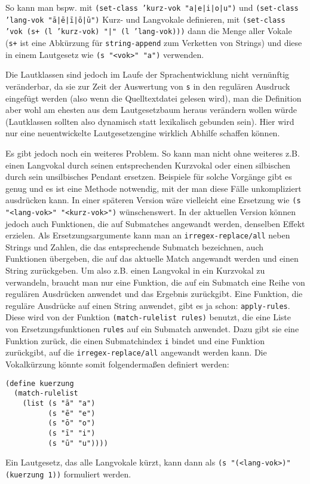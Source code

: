 \documentclass[12pt,a4paper,normalheadings,bibliography=totoc]{scrartcl}
\def\tt#1{\texttt{#1}}
\begin{document}
So kann man bspw. mit \tt{(set-class 'kurz-vok "a|e|i|o|u")} und
\tt{(set-class 'lang-vok "ā|ē|ī|ō|ū")} Kurz- und Langvokale definieren,
mit \tt{(set-class 'vok (s+ (l 'kurz-vok) "|" (l 'lang-vok)))} dann die Menge
aller Vokale
(\tt{s+} ist eine Abkürzung für \tt{string-append} zum Verketten von Strings)
und diese in einem Lautgesetz wie \tt{(s "<vok>" "a")} verwenden.

Die Lautklassen sind jedoch im Laufe der Sprachentwicklung
nicht vernünftig veränderbar,
da sie zur Zeit der Auswertung von \tt{s} in den regulären Ausdruck
eingefügt werden (also wenn die Quelltextdatei gelesen wird),
man die Definition aber wohl am ehesten aus dem Lautgesetzbaum heraus
verändern wollen würde
(Lautklassen sollten also dynamisch statt lexikalisch gebunden sein).
Hier wird nur eine neuentwickelte Lautgesetzengine wirklich
Abhilfe schaffen können.

Es gibt jedoch noch ein weiteres Problem.
So kann man nicht ohne weiteres z.B. einen Langvokal durch seinen
entsprechenden Kurzvokal oder einen silbischen durch sein unsilbisches
Pendant ersetzen.
Beispiele für solche Vorgänge gibt es genug und es ist eine Methode notwendig,
mit der man diese Fälle unkompliziert ausdrücken kann.
In einer späteren Version wäre vielleicht eine Ersetzung wie
\tt{(s "<lang-vok>" "<kurz-vok>")} wünschenswert.
In der aktuellen Version können jedoch auch Funktionen,
die auf Submatches angewandt werden, denselben Effekt erzielen.
Als Ersetzungsargumente kann man an \tt{irregex-replace/all}
neben Strings und Zahlen, die das entsprechende Submatch bezeichnen,
auch Funktionen übergeben,
die auf das aktuelle Match angewandt werden und einen String zurückgeben.
Um also z.B. einen Langvokal in ein Kurzvokal zu verwandeln,
braucht man nur eine Funktion,
die auf ein Submatch eine Reihe von regulären Ausdrücken anwendet
und das Ergebnis zurückgibt.
Eine Funktion, die reguläre Ausdrücke auf einen String anwendet,
gibt es ja schon: \tt{apply-rules}.
Diese wird von der Funktion \tt{(match-rulelist rules)} benutzt,
die eine Liste von Ersetzungsfunktionen \tt{rules}
auf ein Submatch anwendet.
Dazu gibt sie eine Funktion zurück,
die einen Submatchindex \tt{i} bindet und eine Funktion zurückgibt,
auf die \tt{irregex-replace/all} angewandt werden kann.
Die Vokalkürzung könnte somit folgendermaßen definiert werden:
\begin{verbatim}
(define kuerzung
  (match-rulelist
    (list (s "ā" "a")
          (s "ē" "e")
          (s "ō" "o")
          (s "ī" "i")
          (s "ū" "u"))))
\end{verbatim}
Ein Lautgesetz, das alle Langvokale kürzt,
kann dann als \tt{(s "(<lang-vok>)" (kuerzung 1))} formuliert werden.
\end{document}
